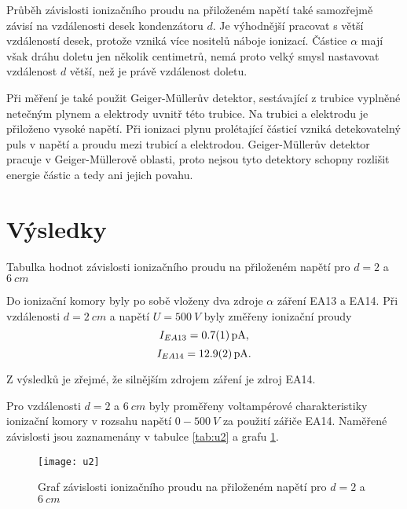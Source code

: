 \documentclass{protokol}
\begin{document}
    Průběh závislosti ionizačního proudu na přiloženém napětí také samozřejmě závisí na vzdále\-nosti desek kondenzátoru $d$. Je výhodnější pracovat s větší vzdáleností desek, protože vzniká více nositelů náboje ionizací. Částice $\alpha$ mají však dráhu doletu jen několik centimetrů, nemá proto velký smysl nastavovat vzdálenost $d$ větší, než je právě vzdálenost doletu.

    Při měření je také použit Geiger-Müllerův detektor, sestávající z trubice vyplněné netečným plynem a elektrody uvnitř této trubice. Na trubici a elektrodu je přiloženo vysoké napětí. Při ionizaci plynu prolétající částicí vzniká detekovatelný puls v napětí a proudu mezi trubicí a elektrodou. Geiger-Müllerův detektor pracuje v Geiger-Müllerově oblasti, proto nejsou tyto detektory schopny rozlišit energie částic a tedy ani jejich povahu.

    \normalsize
    
  \section*{Výsledky}
 
  \begin{wraptable}[14]{R}{0.35\textwidth}
    \centering
    \setlength{\tabcolsep}{10pt}
    
    \caption{Tabulka hodnot závislosti ionizačního proudu na přiloženém napětí pro $d = 2$ a $ \SI{6}{cm}$}
    \label{tab:u2}
   
  \end{wraptable} 

    Do ionizační komory byly po sobě vloženy dva zdroje $\alpha$ záření EA13 a EA14. Při vzdálenosti $d=\SI{2}{cm}$ a napětí $U = \SI{500}{V}$ byly změřeny ionizační proudy
    $$ I_{EA13} = \SI{0.7 \pm 0.1}{pA}, $$
    $$ I_{EA14} = \SI{12.9 \pm 0.2}{pA}. $$
 
    Z výsledků je zřejmé, že silnějším zdrojem záření je zdroj EA14.

    Pro vzdálenosti $d = 2$ a $ \SI{6}{cm}$ byly proměřeny voltampérové charakteristiky ionizační komory v rozsahu napětí $0 - \SI{500}{V}$ za použití zářiče EA14. Naměřené závislosti jsou zaznamenány v tabulce \ref{tab:u2} a grafu \ref{fig:u2}.

    \begin{figure}[H]
      \begin{minipage}{0.63\textwidth}
        \centering
        \texttt{[image: u2]}
        \caption{Graf závislosti ionizačního proudu na přiloženém napětí pro $d = 2$ a $ \SI{6}{cm}$}
        \label{fig:u2}
      \end{minipage}
    \end{figure}
\end{document}
